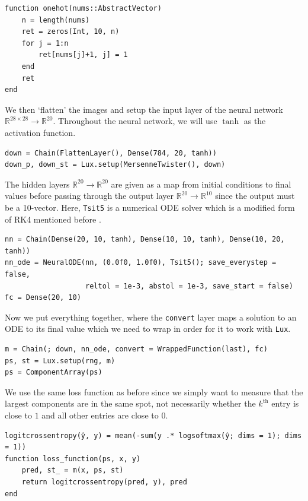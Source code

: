 \documentclass[a4paper,11pt,titlepage]{article}
\theoremstyle{definition}
\theoremstyle{plain}
\theoremstyle{remark}
\begin{document}
\begin{verbatim}
function onehot(nums::AbstractVector)
    n = length(nums)
    ret = zeros(Int, 10, n)
    for j = 1:n
        ret[nums[j]+1, j] = 1
    end
    ret
end
\end{verbatim}

We then ‘flatten’ the images and setup the input layer of the neural network $\mathbb{R}^{28\times28}\rightarrow\mathbb{R}^{20}$. Throughout the neural network, we will use $\tanh$ as the activation function.

\begin{verbatim}
down = Chain(FlattenLayer(), Dense(784, 20, tanh))
down_p, down_st = Lux.setup(MersenneTwister(), down)
\end{verbatim}

The hidden layers $\mathbb{R}^{20}\rightarrow\mathbb{R}^{20}$ are given as a map from initial conditions to final values before passing through the output layer $\mathbb{R}^{20}\rightarrow\mathbb{R}^{10}$ since the output must be a 10-vector. Here, \verb|Tsit5| is a numerical ODE solver which is a modified form of RK4 mentioned before \cite{TSITOURAS2011770}.

\begin{verbatim}
nn = Chain(Dense(20, 10, tanh), Dense(10, 10, tanh), Dense(10, 20, tanh))
nn_ode = NeuralODE(nn, (0.0f0, 1.0f0), Tsit5(); save_everystep = false,
                   reltol = 1e-3, abstol = 1e-3, save_start = false)
fc = Dense(20, 10)
\end{verbatim}

Now we put everything together, where the \verb|convert| layer maps a solution to an ODE to its final value which we need to wrap in order for it to work with \verb|Lux|.

\begin{verbatim}
m = Chain(; down, nn_ode, convert = WrappedFunction(last), fc)
ps, st = Lux.setup(rng, m)
ps = ComponentArray(ps)
\end{verbatim}

We use the same loss function as before since we simply want to measure that the largest components are in the same spot, not necessarily whether the $k^{\mathrm{th}}$ entry is close to $1$ and all other entries are close to $0$.

\begin{verbatim}
logitcrossentropy(ŷ, y) = mean(-sum(y .* logsoftmax(ŷ; dims = 1); dims = 1))
function loss_function(ps, x, y)
    pred, st_ = m(x, ps, st)
    return logitcrossentropy(pred, y), pred
end
\end{verbatim}
\end{document}
